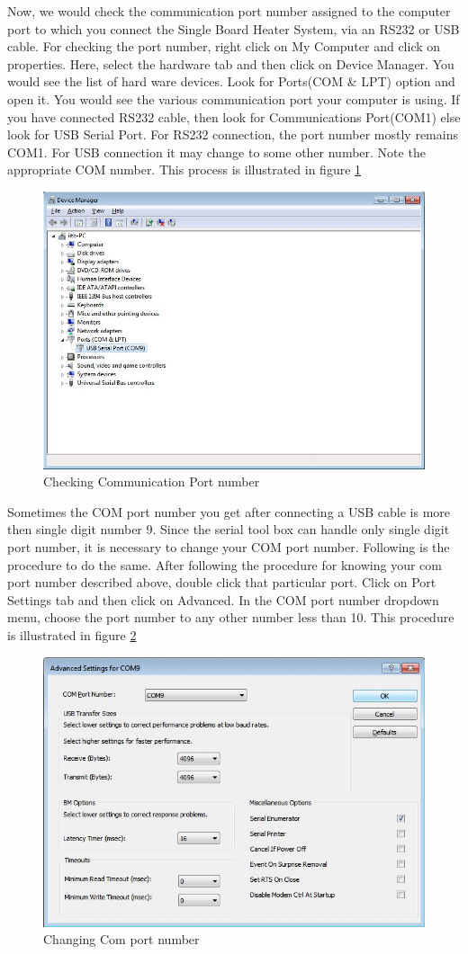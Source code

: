 Now, we would check the communication port number assigned to the computer port to which you connect the Single Board Heater System, via an RS232 or USB cable.  For checking the port number, right click on My Computer and click on properties. Here, select the hardware tab and then click on Device Manager. You would see the list of hard ware devices. Look for Ports(COM \& LPT) option and open it. You would see the various communication port your computer is using. If you have connected RS232 cable, then look for Communications Port(COM1) else look for USB Serial Port. For RS232 connection, the port number mostly remains COM1. For USB connection it may change to some other number. Note the appropriate COM number. This process is illustrated in figure \ref{com_number}
\begin{figure}
\centering
\includegraphics[width=0.7\linewidth]{using-sbhs/COM.jpg}
\caption{Checking Communication Port number}
\label{com_number}
\end{figure}

Sometimes the COM port number you get after connecting a USB cable is more then single digit number 9. Since the serial tool box can handle only single digit port number, it is necessary to change your COM port number. Following is the procedure to do the same.
After following the procedure for knowing your com port number described above, double click that particular port. Click on Port Settings tab and then click on Advanced. In the COM port number dropdown menu, choose the port number to any other number less than 10. This procedure is illustrated in figure \ref{com_change}
\begin{figure}
\centering
\includegraphics[width=0.7\linewidth]{using-sbhs/port2.jpg}
\caption{Changing Com port number}
\label{com_change}
\end{figure}
